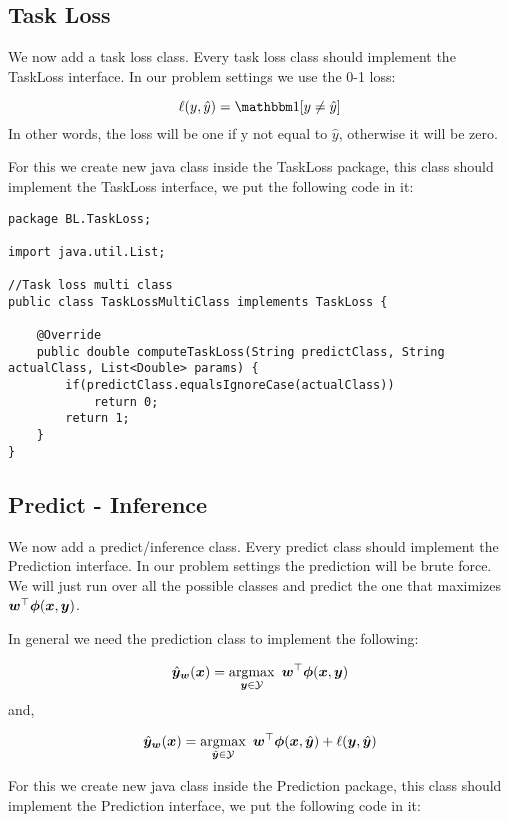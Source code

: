 \documentclass[11pt, oneside]{article}   	%
\begin{document}
\subsection{Task Loss}
We now add a task loss class. Every task loss class should implement the TaskLoss interface. In our problem settings we use the 0-1 loss: 

\begin{equation}
\label{eq:loss}
\ell (y,\hat{y}) = \indicator{y \ne \hat{y}}
\end{equation} 
In other words, the loss will be one if y not equal to $\hat{y}$, otherwise it will be zero. 

For this we create new java class inside the TaskLoss package, this class should implement the TaskLoss interface, we put the following code in it:
\begin{lstlisting}
package BL.TaskLoss;

import java.util.List;

//Task loss multi class
public class TaskLossMultiClass implements TaskLoss {

	@Override
	public double computeTaskLoss(String predictClass, String actualClass, List<Double> params) {
		if(predictClass.equalsIgnoreCase(actualClass))
			return 0;
		return 1;
	}
}
\end{lstlisting}

\subsection{Predict - Inference}
We now add a predict/inference class. Every predict class should implement the Prediction interface. In our problem settings the prediction will be brute force. We will just run over all the possible classes and predict the one that maximizes $\bm{w}^\top \bm{\phi}(\bm{x}, \bm{y})$. 

In general we need the prediction class to implement the following:

\begin{equation}
\label{eq:decoding}
\hat{\bm{y}}_{\bm{w}}(\bm{x}) = \operatorname*{argmax}_{\bm{y} \in \mathcal{Y}} ~ \bm{w}^\top \bm{\phi}(\bm{x}, \bm{y})
\end{equation}
and,

\begin{equation}
\label{eq:augmented-loss}
\hat{\bm{y}}_{\bm{w}}(\bm{x}) = \operatorname*{argmax}_{\hat{\bm{y}} \in \mathcal{Y}} ~ \bm{w}^\top \bm{\phi}(\bm{x}, \hat{\bm{y}}) + \ell (\bm{y},\hat{\bm{y}})
\end{equation}

For this we create new java class inside the Prediction package, this class should implement the Prediction interface, we put the following code in it:
\end{document}
